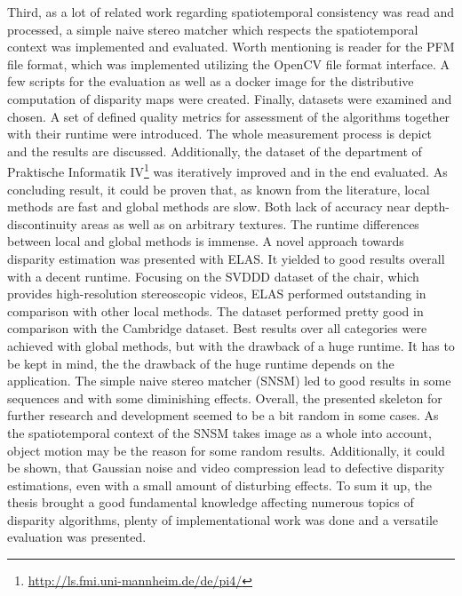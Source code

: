 Third, as a lot of related work regarding spatiotemporal consistency was read and processed, a simple naive stereo matcher which respects the spatiotemporal context was implemented and evaluated.
Worth mentioning is reader for the PFM file format, which was implemented utilizing the OpenCV file format interface.
A few scripts for the evaluation as well as a docker image for the distributive computation of disparity maps were created.
\newline\newline\noindent Finally, datasets were examined and chosen.
A set of defined quality metrics for assessment of the algorithms together with their runtime were introduced.
The whole measurement process is depict and the results are discussed.
Additionally, the dataset of the department of Praktische Informatik IV\footnote{\url{http://ls.fmi.uni-mannheim.de/de/pi4/}} was iteratively improved and in the end evaluated.
\newline\newline\noindent As concluding result, it could be proven that, as known from the literature, local methods are fast and global methods are slow.
Both lack of accuracy near depth-discontinuity areas as well as on arbitrary textures.
The runtime differences between local and global methods is immense.
A novel approach towards disparity estimation was presented with ELAS.
It yielded to good results overall with a decent runtime.
Focusing on the SVDDD dataset of the chair, which provides high-resolution stereoscopic videos, ELAS performed outstanding in comparison with other local methods.
The dataset performed pretty good in comparison with the Cambridge dataset.
Best results over all categories were achieved with global methods, but with the drawback of a huge runtime.
It has to be kept in mind, the the drawback of the huge runtime depends on the application.
The simple naive stereo matcher (SNSM) led to good results in some sequences and with some diminishing effects.
Overall, the presented skeleton for further research and development seemed to be a bit random in some cases.
As the spatiotemporal context of the SNSM takes image as a whole into account, object motion may be the reason for some random results.
Additionally, it could be shown, that Gaussian noise and video compression lead to defective disparity estimations, even with a small amount of disturbing effects.
To sum it up, the thesis brought a good fundamental knowledge affecting numerous topics of disparity algorithms, plenty of implementational work was done and a versatile evaluation was presented.

